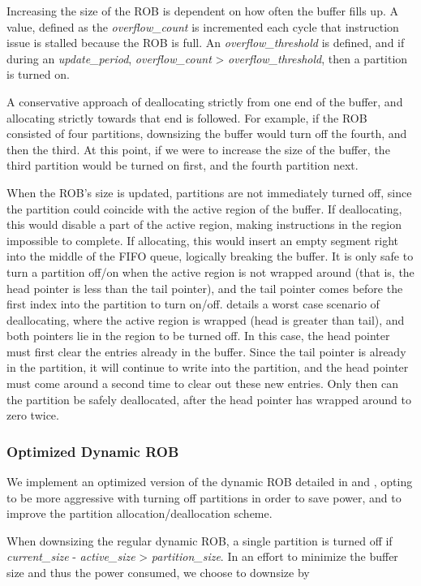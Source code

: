 \documentclass{acm_proc_article-sp}
\begin{document}
Increasing the size of the ROB is dependent on how often the buffer fills up. A value, defined as the {\it overflow\_count} is incremented each cycle that instruction issue is stalled because the ROB is full. An {\it overflow\_threshold} is defined, and if during an {\it update\_period}, {\it overflow\_count} > {\it overflow\_threshold}, then a partition is turned on.

A conservative approach of deallocating strictly from one end of the buffer, and allocating strictly towards that end is followed. For example, if the ROB consisted of four partitions, downsizing the buffer would turn off the fourth, and then the third. At this point, if we were to increase the size of the buffer, the third partition would be turned on first, and the fourth partition next.

When the ROB's size is updated, partitions are not immediately turned off, since the partition could coincide with the active region of the buffer. If deallocating, this would disable a part of the active region, making instructions in the region impossible to complete. If allocating, this would insert an empty segment right into the middle of the FIFO queue, logically breaking the buffer. It is only safe to turn a partition off/on when the active region is not wrapped around (that is, the head pointer is less than the tail pointer), and the tail pointer comes before the first index into the partition to turn on/off. \cite{kucuk3} details a worst case scenario of deallocating, where the active region is wrapped (head is greater than tail), and both pointers lie in the region to be turned off. In this case, the head pointer must first clear the entries already in the buffer. Since the tail pointer is already in the partition, it will continue to write into the partition, and the head pointer must come around a second time to clear out these new entries. Only then can the partition be safely deallocated, after the head pointer has wrapped around to zero twice.

\subsubsection{Optimized Dynamic ROB}
We implement an optimized version of the dynamic ROB detailed in \cite{kucuk2} and \cite{kucuk3}, opting to be more aggressive with turning off partitions in order to save power, and to improve the partition allocation/deallocation scheme.

When downsizing the regular dynamic ROB, a single partition is turned off if {\it current\_size} - {\it active\_size} > {\it partition\_size}. In an effort to minimize the buffer size and thus the power consumed, we choose to downsize by
\end{document}

